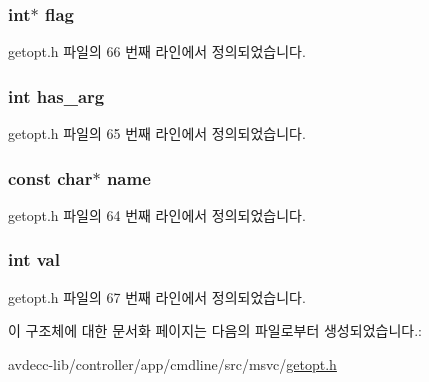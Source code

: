 \subsubsection[{\texorpdfstring{flag}{flag}}]{\setlength{\rightskip}{0pt plus 5cm}int$\ast$ flag}\hypertarget{structoption_a4f1a91bc2d61b12ffb90ff2857d6a4d8}{}\label{structoption_a4f1a91bc2d61b12ffb90ff2857d6a4d8}


getopt.\+h 파일의 66 번째 라인에서 정의되었습니다.

\subsubsection[{\texorpdfstring{has\+\_\+arg}{has_arg}}]{\setlength{\rightskip}{0pt plus 5cm}int has\+\_\+arg}\hypertarget{structoption_afd57c1e532cb0bc43cc77ac7b4dd3350}{}\label{structoption_afd57c1e532cb0bc43cc77ac7b4dd3350}


getopt.\+h 파일의 65 번째 라인에서 정의되었습니다.

\subsubsection[{\texorpdfstring{name}{name}}]{\setlength{\rightskip}{0pt plus 5cm}const char$\ast$ name}\hypertarget{structoption_a8f8f80d37794cde9472343e4487ba3eb}{}\label{structoption_a8f8f80d37794cde9472343e4487ba3eb}


getopt.\+h 파일의 64 번째 라인에서 정의되었습니다.

\subsubsection[{\texorpdfstring{val}{val}}]{\setlength{\rightskip}{0pt plus 5cm}int val}\hypertarget{structoption_aa0ccb5ee6d882ee3605ff47745c6467b}{}\label{structoption_aa0ccb5ee6d882ee3605ff47745c6467b}


getopt.\+h 파일의 67 번째 라인에서 정의되었습니다.



이 구조체에 대한 문서화 페이지는 다음의 파일로부터 생성되었습니다.\+:\begin{DoxyCompactItemize}
\item 
avdecc-\/lib/controller/app/cmdline/src/msvc/\hyperlink{getopt_8h}{getopt.\+h}\end{DoxyCompactItemize}
